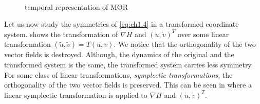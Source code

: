 \begin{figure} [t]
	\begin{centering}
	 \\
	\caption{temporal representation of MOR}
	\label{fig:ch1.2}
	\end{centering}
\end{figure}


Let us now study the symmetries of \eqref{eq:ch1.4} in a transformed coordinate system.  shows the transformation of $\nabla H$ and $(\dot u, \dot v)^T$ over some linear transformation $(\tilde u, \tilde v) = T(u,v)$. We notice that the orthogonality of the two vector fields is destroyed. Although, the dynamics of the original and the transformed system is the same, the transformed system carries less symmetry. For some class of linear transformations, \emph{symplectic transformations}, the orthogonality of the two vector fields is preserved. This can be seen in  where a linear symplectic transformation is applied to $\nabla H$ and $(\dot u, \dot v)^T$.

